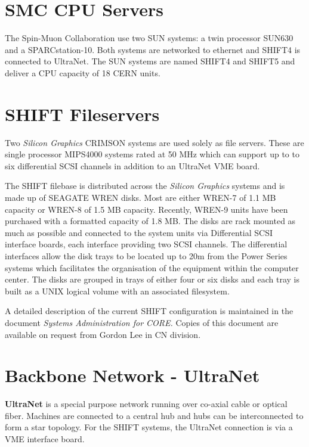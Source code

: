 \section {SMC CPU Servers}
 
The Spin-Muon Collaboration use two SUN systems: a twin
processor SUN630 and a SPARCstation-10.
Both systems are networked to ethernet and SHIFT4 is
connected to UltraNet.
The SUN systems are named SHIFT4 and SHIFT5
and deliver a CPU capacity of 18 CERN units.
 
\section {SHIFT Fileservers}
 
Two
{\em Silicon Graphics}
CRIMSON systems are used solely as file servers.
These are single processor MIPS4000 systems rated at 50 MHz
which can support up to to six differential SCSI channels in addition
to an UltraNet VME board.
 
The SHIFT filebase is distributed across the
{\em Silicon Graphics}
systems and is made up of SEAGATE WREN disks.
Most are either WREN-7 of 1.1 MB capacity or WREN-8 of 1.5 MB capacity.
Recently, WREN-9 units have been purchased with a formatted capacity of 1.8 MB.
The disks are rack mounted as much as possible and connected
to the system units via Differential SCSI interface boards,
each interface providing two SCSI channels.
The differential interfaces allow the disk trays to be located
up to 20m from the Power Series systems which facilitates
the organisation of the equipment within the computer center.
The disks are grouped in trays of either four or six disks and each
tray is built as a UNIX logical volume with an associated filesystem.
 
A detailed description of the current SHIFT configuration is maintained
in the document
{\em Systems Administration for CORE.}
Copies of this document are available on request from Gordon Lee in CN division.
 
\section {Backbone Network - UltraNet}
 
{\bf UltraNet}
is a special purpose network running over co-axial cable or optical fiber.
Machines are connected to a central hub and hubs can be interconnected
to form a star topology.
For the SHIFT systems, the UltraNet connection is via a VME interface board.
 
